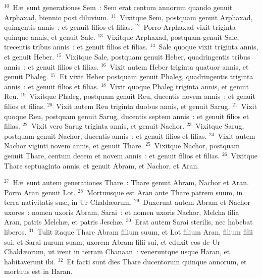 ${}^{10}$~H\ae\ sunt generationes Sem~: Sem erat centum annorum quando genuit Arphaxad, biennio post diluvium.
${}^{11}$~Vixitque Sem, postquam genuit Arphaxad, quingentis annis~: et genuit filios et filias.
${}^{12}$~Porro Arphaxad vixit triginta quinque annis, et genuit Sale.
${}^{13}$~Vixitque Arphaxad, postquam genuit Sale, trecentis tribus annis~: et genuit filios et filias.
${}^{14}$~Sale quoque vixit triginta annis, et genuit Heber.
${}^{15}$~Vixitque Sale, postquam genuit Heber, quadringentis tribus annis~: et genuit filios et filias.
${}^{16}$~Vixit autem Heber triginta quatuor annis, et genuit Phaleg.
${}^{17}$~Et vixit Heber postquam genuit Phaleg, quadringentis triginta annis~: et genuit filios et filias.
${}^{18}$~Vixit quoque Phaleg triginta annis, et genuit Reu.
${}^{19}$~Vixitque Phaleg, postquam genuit Reu, ducentis novem annis~: et genuit filios et filias.
${}^{20}$~Vixit autem Reu triginta duobus annis, et genuit Sarug.
${}^{21}$~Vixit quoque Reu, postquam genuit Sarug, ducentis septem annis~: et genuit filios et filias.
${}^{22}$~Vixit vero Sarug triginta annis, et genuit Nachor.
${}^{23}$~Vixitque Sarug, postquam genuit Nachor, ducentis annis~: et genuit filios et filias.
${}^{24}$~Vixit autem Nachor viginti novem annis, et genuit Thare.
${}^{25}$~Vixitque Nachor, postquam genuit Thare, centum decem et novem annis~: et genuit filios et filias.
${}^{26}$~Vixitque Thare septuaginta annis, et genuit Abram, et Nachor, et Aran.


${}^{27}$~H\ae\ sunt autem generationes Thare~: Thare genuit Abram, Nachor et Aran. Porro Aran genuit Lot.
${}^{28}$~Mortuusque est Aran ante Thare patrem suum, in terra nativitatis su\ae , in Ur Chald\ae orum.
${}^{29}$~Duxerunt autem Abram et Nachor uxores~: nomen uxoris Abram, Sarai~: et nomen uxoris Nachor, Melcha filia Aran, patris Melch\ae , et patris Jesch\ae .
${}^{30}$~Erat autem Sarai sterilis, nec habebat liberos.
${}^{31}$~Tulit itaque Thare Abram filium suum, et Lot filium Aran, filium filii sui, et Sarai nurum suam, uxorem Abram filii sui, et eduxit eos de Ur Chald\ae orum, ut irent in terram Chanaan~: veneruntque usque Haran, et habitaverunt ibi.
${}^{32}$~Et facti sunt dies Thare ducentorum quinque annorum, et mortuus est in Haran.

